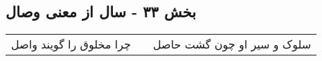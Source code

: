 \begin{center}
\section*{بخش ۳۳ - سال از معنی وصال}
\label{sec:sh033}
\begin{longtable}{l p{0.5cm} r}
چرا مخلوق را گویند واصل
&&
سلوک و سیر او چون گشت حاصل
\\
\end{longtable}
\end{center}
